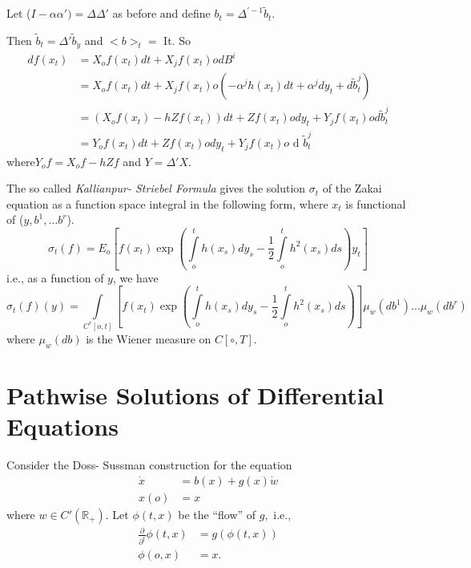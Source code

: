 Let ($I- \alpha \alpha')= \Delta \Delta'$ as before and define $b_t =
\Delta^{' -1}\tilde{b}_t$. 

Then $\tilde{b}_t = \Delta' \tilde{b}_y$ and $<b>_t =$ It. So 
\begin{align*}
  df(x_t) & = X_o f(x_t) dt + X_j f(x_t)  o dB^i \\
  & = X_o f(x_t) dt + X_j f(x_t)  o (-\alpha^j h(x_t)dt+ \alpha^j dy_t
  + d\tilde{b}^j_t)\\ 
  & = (X_o f(x_t) - hZf(x_t))dt+Zf(x_t)ody_t+Y_j f(x_t) o d\tilde{b}^j_t \\
  & = Y_o f(x_t) dt + Zf(x_t) o dy_t + Y_j f(x_t) o \text{ d } \tilde{b}^j_t
\end{align*}
where\pageoriginale $Y_o f = X_of - hZf $ and $Y = \Delta' X$.

The so called \textit{Kallianpur- Striebel Formula}  gives the
solution $\sigma_t$ of the Zakai equation as a function space integral
in the following form, where $x_t$ is functional of ($y,b^1, \ldots
b^r$).  
$$
\sigma_t(f) = E_o \left[ f(x_t) \exp \left( \int \limits^t_o h(x_s) dy_s -
  \frac{1}{2} \int \limits^t_o h^2 (x_s)ds \right) y_t \right] 
$$
i.e., as a function of $y$, we have 
{\fontsize{10pt}{12pt}\selectfont
$$
\sigma_t(f)(y) = \int \limits_{C^r[o,t]} \left[ f(x_t) \exp \left(\int
  \limits^t_o h(x_s) dy_s- \frac{1}{2} \int \limits^t_o h^2
  (x_s)ds\right) \right] \mu_w (db^1) \ldots\mu_w(db^r)  
$$}\relax
where $\mu_w (db)$ is the Wiener measure on $C[\circ, T]$.



\section{Pathwise Solutions of Differential
  Equations}\label{part2:sec2}%

Consider the Doss- Sussman construction for the equation
\begin{align*}
  \dot{x} &= b(x) + g(x)\dot{w}\tag{1}\label{part2:sec2:eq1}\\
  x(o) &=x
\end{align*}
where $w \in  C'(\mathbb{R}_+)$. Let $\phi (t,x) $ be the
``flow'' of $g,$ i.e., 
\begin{align*}
  \frac{\partial}{\partial^t} \phi (t,x) & = g(\phi (t,x)) \\
  \phi(o,x) & =  x.
\end{align*}

